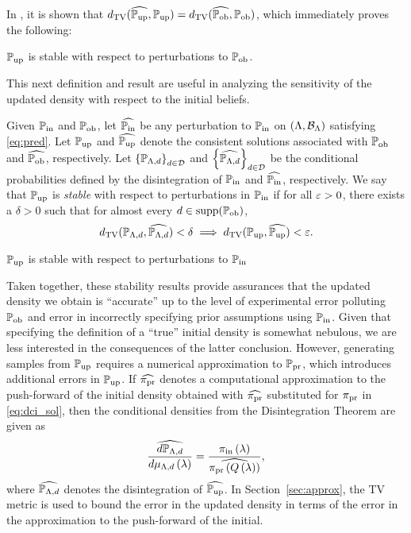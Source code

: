 In \cite{BJW18}, it is shown that $d_{\text{TV}} (\widehat{\operatorname*{\mathbb{P}_{up}}}, \operatorname*{\mathbb{P}_{up}}) = d_{\text{TV}} (\widehat{\operatorname*{\mathbb{P}_{ob}}}, \operatorname*{\mathbb{P}_{ob}})$, which immediately proves the following:

\begin{thm}
  $\operatorname*{\mathbb{P}_{up}}$ is stable with respect to perturbations to $\operatorname*{\mathbb{P}_{ob}}$.
  \label{thm:stableobs}
\end{thm}

This next definition and result are useful in analyzing the sensitivity of the updated density with respect to the initial beliefs.

\begin{defn}\label{defn:stableinitial}
  Given $\operatorname*{\mathbb{P}_{in}}$ and $\operatorname*{\mathbb{P}_{ob}}$, let $\widehat{\operatorname*{\mathbb{P}_{in}}}$ be any perturbation to $\operatorname*{\mathbb{P}_{in}}$ on $({\Lambda}, \mathcal{B}_{{\Lambda}})$ satisfying \eqref{eq:pred}. 
  Let $\operatorname*{\mathbb{P}_{up}}$ and $\widehat{\operatorname*{\mathbb{P}_{up}}}$ denote the consistent solutions associated with $\operatorname*{\mathbb{P}_{ob}}$ and $\widehat{\operatorname*{\mathbb{P}_{ob}}}$, respectively. 
  Let $\left\{\mathbb{P}_{{\Lambda}, d}\right\}_{d\in\mathcal{D}}^{}$ and $\left\{\widehat{\mathbb{P}_{{\Lambda}, d}}\right\}_{d\in\mathcal{D}}^{}$ be the conditional probabilities defined by the disintegration of $\operatorname*{\mathbb{P}_{in}}$ and $\widehat{\operatorname*{\mathbb{P}_{in}}}$, respectively. 
  We say that $\operatorname*{\mathbb{P}_{up}}$ is \emph{stable} with respect to perturbations in $\operatorname*{\mathbb{P}_{in}}$ if for all $\varepsilon > 0$, there exists a $\delta > 0$ such that for almost every $d\in\text{supp}(\operatorname*{\mathbb{P}_{ob}})$, 
  \begin{equation}\label{eq:stableinitial}
    d_{\text{TV}} (\mathbb{P}_{{\Lambda}, d}, \widehat{\mathbb{P}_{{\Lambda}, d}}) < \delta \implies d_{\text{TV}} (\operatorname*{\mathbb{P}_{up}}, \widehat{\operatorname*{\mathbb{P}_{up}}}) < \varepsilon.
  \end{equation}
\end{defn}

\begin{thm}
  $\operatorname*{\mathbb{P}_{up}}$ is stable with respect to perturbations to $\operatorname*{\mathbb{P}_{in}}$
  \label{thm:stableinitial}
\end{thm}

Taken together, these stability results provide assurances that the updated density we obtain is ``accurate'' up to the level of experimental error polluting $\operatorname*{\mathbb{P}_{ob}}$ and error in incorrectly specifying prior assumptions using $\operatorname*{\mathbb{P}_{in}}$. 
Given that specifying the definition of a ``true'' initial density is somewhat nebulous, we are less interested in the consequences of the latter conclusion.
However, generating samples from $\operatorname*{\mathbb{P}_{up}}$ requires a numerical approximation to $\operatorname*{\mathbb{P}_{pr}}$, which introduces additional errors in $\operatorname*{\mathbb{P}_{up}}$.
If $\widehat{\operatorname*{\pi_{pr}}}$ denotes a computational approximation to the push-forward of the initial density obtained with $\widehat{\operatorname*{\pi_{pr}}}$ substituted for $\operatorname*{\pi_{pr}}$ in \eqref{eq:dci_sol}, then the conditional densities from the Disintegration Theorem are given as
\[
\frac{\widehat{d\mathbb{P}_{{\Lambda}, d}}}{d\mu_{{\Lambda}, d}\left ( \lambda \right )} = \frac{\operatorname*{\pi_{in}}\left ( \lambda \right )}{ \widehat{\operatorname*{\pi_{pr}}\left ( Q\left ( \lambda \right ) \right )} },
\]
where $\widehat{\mathbb{P}_{{\Lambda}, d}}$ denotes the disintegration of $\widehat{\operatorname*{\mathbb{P}_{up}}}$.
In Section~\ref{sec:approx}, the TV metric is used to bound the error in the updated density in terms of the error in the approximation to the push-forward of the initial.



